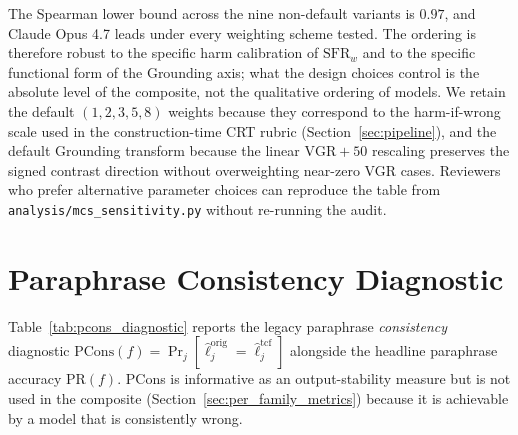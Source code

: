 \documentclass{article}
\begin{document}
The Spearman lower bound across the nine non-default variants is $0.97$, and Claude Opus 4.7 leads under every weighting scheme tested. The ordering is therefore robust to the specific harm calibration of $\mathrm{SFR}_w$ and to the specific functional form of the Grounding axis; what the design choices control is the absolute level of the composite, not the qualitative ordering of models. We retain the default $(1,2,3,5,8)$ weights because they correspond to the harm-if-wrong scale used in the construction-time CRT rubric (Section~\ref{sec:pipeline}), and the default Grounding transform because the linear $\mathrm{VGR}+50$ rescaling preserves the signed contrast direction without overweighting near-zero VGR cases. Reviewers who prefer alternative parameter choices can reproduce the table from \texttt{analysis/mcs\_sensitivity.py} without re-running the audit.

\section{Paraphrase Consistency Diagnostic}
\label{app:pcons_diagnostic}

Table~\ref{tab:pcons_diagnostic} reports the legacy paraphrase \emph{consistency} diagnostic $\mathrm{PCons}(f)=\Pr_j[\hat{\ell}^{\mathrm{orig}}_j=\hat{\ell}^{\mathrm{tcf}}_j]$ alongside the headline paraphrase accuracy $\mathrm{PR}(f)$. PCons is informative as an output-stability measure but is not used in the composite (Section~\ref{sec:per_family_metrics}) because it is achievable by a model that is consistently wrong.
\end{document}
